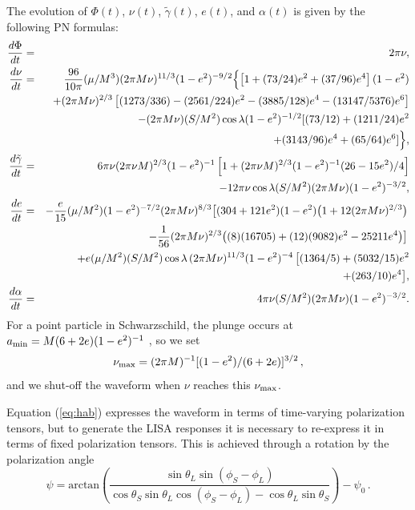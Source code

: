 \documentclass[12pt]{iopart}
\def\be{\begin{equation}}
\def\ee{\end{equation}}
\begin{document}
The evolution of $\Phi(t)$, $\nu(t)$, $\tilde\gamma(t)$, $e(t)$, and $\alpha(t)$ is given by the following PN formulas:
\begin{eqnarray}
\frac{d\Phi}{dt} &=& 2\pi\nu, \label{Phidot} \\
\frac{d\nu}{dt} &=&
\frac{96}{10\pi}(\mu/M^3)(2\pi M\nu)^{11/3}(1-e^2)^{-9/2}
\Bigl\{
\left[1+(73/24)e^2+(37/96)e^4\right](1-e^2) \nonumber \\
&&+ (2\pi M\nu)^{2/3}\left[(1273/336)-(2561/224)e^2-(3885/128)e^4
-(13147/5376)e^6 \right] \nonumber \\
&&- (2\pi M\nu)(S/M^2)\cos\lambda (1-e^2)^{-1/2}[(73/12)
+ (1211/24)e^2 \nonumber \\
&&+(3143/96)e^4 +(65/64)e^6]
\Bigr\}, \label{nudot} \\
%
\frac{d\tilde\gamma}{dt} &=& 6\pi\nu(2\pi\nu M)^{2/3} (1-e^2)^{-1}
\left[1+(2\pi\nu M)^{2/3} (1-e^2)^{-1}(26-15e^2)/4\right] \nonumber \\
&&-12\pi\nu\cos\lambda (S/M^2) (2\pi M\nu)(1-e^2)^{-3/2},
\label{Gamdot} \\
%
\frac{de}{dt}  &=& -\frac{e}{15}(\mu/M^2) (1-e^2)^{-7/2} (2\pi M\nu)^{8/3}
\bigl[(304+121e^2)(1-e^2)\bigl(1 + 12 (2\pi M\nu)^{2/3}\bigr) \, \nonumber \\
&&- \frac{1}{56}(2\pi M\nu)^{2/3}\bigl( (8)(16705) + (12)(9082)e^2 - 25211e^4 \bigr)\bigr]\,
\nonumber \\
&&+ e (\mu/M^2)(S/M^2)\cos\lambda\,(2\pi M\nu)^{11/3}(1-e^2)^{-4}
\, \bigl[(1364/5) + (5032/15)e^2 \nonumber \\ && + (263/10)e^4\bigr] ,
\label{edot} \\
%
\frac{d\alpha}{dt} &=& 4\pi\nu (S/M^2) (2\pi M\nu)(1-e^2)^{-3/2}.
\label{alphadot}
\end{eqnarray}
%
For a point particle in Schwarzschild, the plunge occurs at
$a_{\rm min} = M (6 + 2e)(1-e^2)^{-1}$ \cite{ckp},
so we set
\be\label{numax}
\nu_{\rm max} = (2\pi M)^{-1}[(1-e^2)/(6 + 2e)]^{3/2} \, ,
\ee
and we shut-off the waveform when $\nu$ reaches this $\nu_{\rm max}$.

Equation (\ref{eq:hab}) expresses the waveform in terms of time-varying polarization tensors, but to generate the LISA responses it is necessary to re-express it in terms of fixed polarization tensors. This is achieved through a rotation by the polarization angle
\begin{equation}\label{psiSL}
\psi = \mathrm{arctan}\left(\frac{\sin\theta_L \sin(\phi_S-\phi_L)}{\cos \theta_S \sin \theta_L \cos(\phi_S - \phi_L) - \cos\theta_L \sin\theta_S}\right) - \psi_0\,.
\end{equation}
\end{document}
